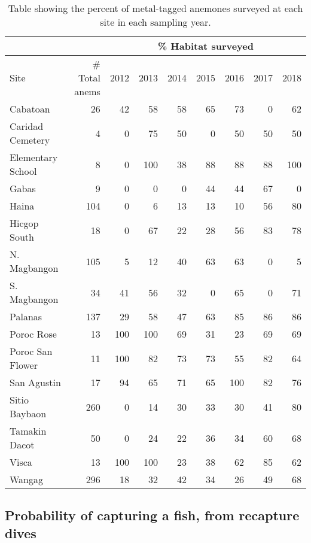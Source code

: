 \documentclass[12pt, oneside]{article}   	%
\begin{document}
\begin{table}
\begin{centering}
\begin{tabular}{|l|r|r|r|r|r|r|r|r|}
\hline 
\multicolumn{2}{|c|}{} & \multicolumn{7}{|c|}{\% Habitat surveyed} \\ \hline
Site & \# Total anems & 2012 & 2013 & 2014 & 2015 & 2016 & 2017 & 2018 \\ \hline
Cabatoan & 26 & 42 & 58 & 58 & 65 & 73 & 0 & 62 \\ \hline
Caridad Cemetery & 4 & 0 & 75 & 50 & 0 & 50 & 50 & 50 \\ \hline
Elementary School & 8 & 0 & 100 & 38 & 88 & 88 & 88 & 100 \\ \hline
Gabas & 9 & 0 & 0 & 0 & 44 & 44 & 67 & 0 \\ \hline
Haina & 104 & 0 & 6 & 13 & 13 & 10 & 56 & 80 \\ \hline
Hicgop South & 18 & 0 & 67 & 22 & 28 & 56 & 83 & 78 \\ \hline
N. Magbangon & 105 & 5 & 12 & 40 & 63 & 63 & 0 & 5 \\ \hline
S. Magbangon & 34 & 41 & 56 & 32 & 0 & 65 & 0 & 71 \\ \hline
Palanas & 137 & 29 & 58 & 47 & 63 & 85 & 86 & 86 \\ \hline
Poroc Rose & 13 & 100 & 100 & 69 & 31 & 23 & 69 & 69 \\ \hline
Poroc San Flower & 11 & 100 & 82 & 73 & 73 & 55 & 82 & 64 \\ \hline
San Agustin & 17 & 94 & 65 & 71 & 65 & 100 & 82 & 76 \\ \hline
Sitio Baybaon & 260 & 0 & 14 & 30 & 33 & 30 & 41 & 80 \\ \hline
Tamakin Dacot & 50 & 0 & 24 & 22 & 36 & 34 & 60 & 68 \\ \hline
Visca & 13 & 100 & 100 & 23 & 38 & 62 & 85 & 62 \\ \hline
Wangag & 296 & 18 & 32 & 42 & 34 & 26 & 49 & 68 \\ \hline
\end{tabular}
\end{centering}
\caption{Table showing the percent of metal-tagged anemones surveyed at each site in each sampling year.}\label{APP_TAB_PercHabSampled}
\end{table}

\newpage{}

\subsection{Probability of capturing a fish, from recapture dives} \label{APP_SEC_ProbR}
\end{document}
